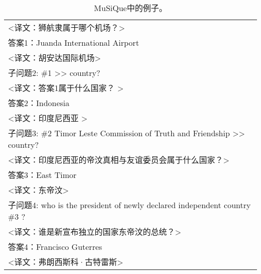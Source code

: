 \begin{table}[htbp]
\begin{tabular}{p{420pt}}
    <译文：狮航隶属于哪个机场？> \\
    答案1：Juanda International Airport \\
    <译文：胡安达国际机场> \\
    \hline
    子问题2: \#1 >> country? \\
    <译文：答案1属于什么国家？ > \\
    答案2：Indonesia \\
    <译文：印度尼西亚 > \\
    \hline
    子问题3: \#2 Timor Leste Commission of Truth and Friendship >> country? \\
    <译文：印度尼西亚的帝汶真相与友谊委员会属于什么国家？> \\
    答案3：East Timor \\
    <译文：东帝汶> \\
    \hline
    子问题4: who is the president of newly declared independent country \#3 ? \\
    <译文：谁是新宣布独立的国家东帝汶的总统？> \\
    答案4：Francisco Guterres \\
    <译文：弗朗西斯科·古特雷斯> \\
    \hline
    \end{tabular}
    \caption{\label{tab:5-1}
    MuSiQue中的例子。
    }
\end{table}
